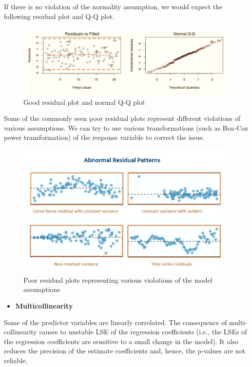 \documentclass[
]{book}
\providecommand{\tightlist}{%
  \setlength{\itemsep}{0pt}\setlength{\parskip}{0pt}}
\begin{document}
If there is no violation of the normality assumption, we would expect the following residual plot and Q-Q plot.

\begin{figure}

{\centering \includegraphics[width=0.8\linewidth]{img10/w10-GoodResidualPlots} 

}

\caption{Good residual plot and normal Q-Q plot}\label{fig:unnamed-chunk-155}
\end{figure}

Some of the commonly seen poor residual plots represent different violations of various assumptions. We can try to use various transformations (such as Box-Cox power transformation) of the response variable to correct the issue.

\begin{figure}

{\centering \includegraphics[width=0.8\linewidth]{img10/w10-BadResidualPlots} 

}

\caption{Poor residual plots representing various violations of the model assumptions}\label{fig:unnamed-chunk-156}
\end{figure}

\begin{itemize}
\tightlist
\item
  \textbf{Multicollinearity}
\end{itemize}

Some of the predictor variables are linearly correlated. The consequence of multi-collinearity causes to unstable LSE of the regression coefficients (i.e., the LSEs of the regression coefficients are sensitive to a small change in the model). It also reduces the precision of the estimate coefficients and, hence, the p-values are not reliable.
\end{document}
